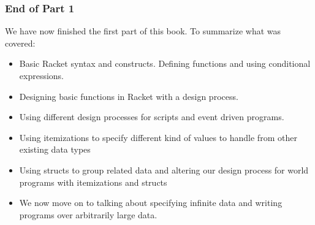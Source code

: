 \documentclass{beamer}
\begin{document}
\begin{frame}
  \frametitle{End of Part 1}
  We have now finished the first part of this book. To summarize what was
  covered:
  \begin{itemize}
  \item<2-> Basic Racket syntax and constructs. Defining functions and using
    conditional expressions.
  \item<3-> Designing basic functions in Racket with a design process.
  \item<4-> Using different design processes for scripts and event driven programs.
  \item<5-> Using itemizations to specify different kind of values to handle
    from other existing data types
  \item<6-> Using structs to group related data and altering our design process
    for world programs with itemizations and structs
  \item<7-> We now move on to talking about specifying infinite data and writing
    programs over arbitrarily large data.
  \end{itemize}
\end{frame}
\end{document}

